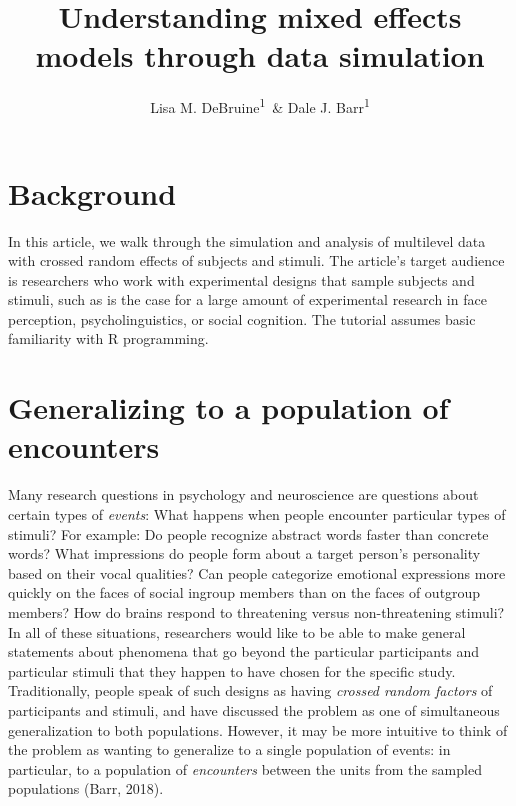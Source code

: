 \documentclass[doc,floatsintext]{apa6}
\title{Understanding mixed effects models through data simulation}
\author{Lisa M. DeBruine\textsuperscript{1}~\& Dale J. Barr\textsuperscript{1}}
\date{}
\affiliation{
\vspace{0.5cm}
\textsuperscript{1} Institute of Neuroscience and Psychology, University of Glasgow}
\begin{document}
\maketitle

\section{Background}\label{background}

In this article, we walk through the simulation and analysis of
multilevel data with crossed random effects of subjects and stimuli. The
article's target audience is researchers who work with experimental
designs that sample subjects and stimuli, such as is the case for a
large amount of experimental research in face perception,
psycholinguistics, or social cognition. The tutorial assumes basic
familiarity with R programming.

\section{Generalizing to a population of
encounters}\label{generalizing-to-a-population-of-encounters}

Many research questions in psychology and neuroscience are questions
about certain types of \emph{events}: What happens when people encounter
particular types of stimuli? For example: Do people recognize abstract
words faster than concrete words? What impressions do people form about
a target person's personality based on their vocal qualities? Can people
categorize emotional expressions more quickly on the faces of social
ingroup members than on the faces of outgroup members? How do brains
respond to threatening versus non-threatening stimuli? In all of these
situations, researchers would like to be able to make general statements
about phenomena that go beyond the particular participants and
particular stimuli that they happen to have chosen for the specific
study. Traditionally, people speak of such designs as having
\emph{crossed random factors} of participants and stimuli, and have
discussed the problem as one of simultaneous generalization to both
populations. However, it may be more intuitive to think of the problem
as wanting to generalize to a single population of events: in
particular, to a population of \emph{encounters} between the units from
the sampled populations (Barr, 2018).
\end{document}
